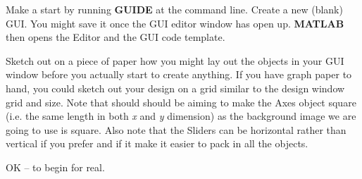 \documentclass{tufte-book} %
\begin{document}
Make a start by running \textbf{GUIDE} at the command line. Create a new (blank) GUI. You might save it once the GUI editor window has open up. \textbf{MATLAB} then opens the \textsf{Editor} and the GUI code template.

Sketch out on a piece of paper how you might lay out the objects in your GUI window before you actually start to create anything.
If you have graph paper to hand, you could sketch out your design on a grid similar to the design window grid and size. Note that should should be aiming to make the \textsf{Axes} object square (i.e. the same length in both \textit{x} and \textit{y} dimension) as the background image we are going to use is square. Also note that the \textsf{Sliders} can be horizontal rather than vertical if you prefer and if it make it easier to pack in all the objects.

OK -- to begin for real.
\end{document}
